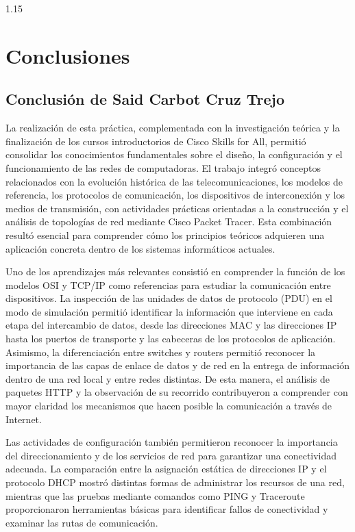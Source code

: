 \documentclass[11pt, a4paper]{article}
\begin{document}
\begin{spacing}{1.15}
\clearpage

\section{Conclusiones}

\subsection{Conclusión de Said Carbot Cruz Trejo}

La realización de esta práctica, complementada con la investigación teórica y la finalización de los cursos introductorios de Cisco Skills for All, permitió consolidar los conocimientos fundamentales sobre el diseño, la configuración y el funcionamiento de las redes de computadoras. El trabajo integró conceptos relacionados con la evolución histórica de las telecomunicaciones, los modelos de referencia, los protocolos de comunicación, los dispositivos de interconexión y los medios de transmisión, con actividades prácticas orientadas a la construcción y el análisis de topologías de red mediante Cisco Packet Tracer. Esta combinación resultó esencial para comprender cómo los principios teóricos adquieren una aplicación concreta dentro de los sistemas informáticos actuales.

Uno de los aprendizajes más relevantes consistió en comprender la función de los modelos OSI y TCP/IP como referencias para estudiar la comunicación entre dispositivos. La inspección de las unidades de datos de protocolo (PDU) en el modo de simulación permitió identificar la información que interviene en cada etapa del intercambio de datos, desde las direcciones MAC y las direcciones IP hasta los puertos de transporte y las cabeceras de los protocolos de aplicación. Asimismo, la diferenciación entre switches y routers permitió reconocer la importancia de las capas de enlace de datos y de red en la entrega de información dentro de una red local y entre redes distintas. De esta manera, el análisis de paquetes HTTP y la observación de su recorrido contribuyeron a comprender con mayor claridad los mecanismos que hacen posible la comunicación a través de Internet.

Las actividades de configuración también permitieron reconocer la importancia del direccionamiento y de los servicios de red para garantizar una conectividad adecuada. La comparación entre la asignación estática de direcciones IP y el protocolo DHCP mostró distintas formas de administrar los recursos de una red, mientras que las pruebas mediante comandos como PING y Traceroute proporcionaron herramientas básicas para identificar fallos de conectividad y examinar las rutas de comunicación.


\end{spacing}
\end{document}
